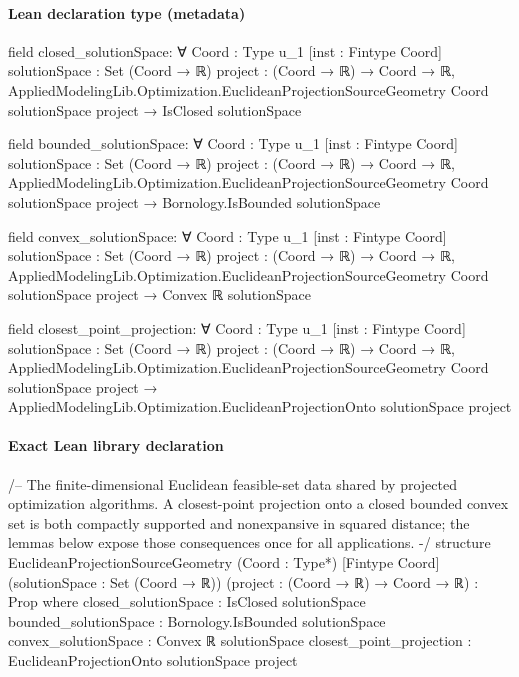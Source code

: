 \documentclass[10pt]{article}
\begin{document}
\paragraph{Lean declaration type (metadata)}
\begin{ReviewVerbatim}
field closed_solutionSpace:
∀ {Coord : Type u_1} [inst : Fintype Coord] {solutionSpace : Set (Coord → ℝ)} {project : (Coord → ℝ) → Coord → ℝ},
  AppliedModelingLib.Optimization.EuclideanProjectionSourceGeometry Coord solutionSpace project → IsClosed solutionSpace

field bounded_solutionSpace:
∀ {Coord : Type u_1} [inst : Fintype Coord] {solutionSpace : Set (Coord → ℝ)} {project : (Coord → ℝ) → Coord → ℝ},
  AppliedModelingLib.Optimization.EuclideanProjectionSourceGeometry Coord solutionSpace project →
    Bornology.IsBounded solutionSpace

field convex_solutionSpace:
∀ {Coord : Type u_1} [inst : Fintype Coord] {solutionSpace : Set (Coord → ℝ)} {project : (Coord → ℝ) → Coord → ℝ},
  AppliedModelingLib.Optimization.EuclideanProjectionSourceGeometry Coord solutionSpace project → Convex ℝ solutionSpace

field closest_point_projection:
∀ {Coord : Type u_1} [inst : Fintype Coord] {solutionSpace : Set (Coord → ℝ)} {project : (Coord → ℝ) → Coord → ℝ},
  AppliedModelingLib.Optimization.EuclideanProjectionSourceGeometry Coord solutionSpace project →
    AppliedModelingLib.Optimization.EuclideanProjectionOnto solutionSpace project
\end{ReviewVerbatim}

\paragraph{Exact Lean library declaration}
\begin{ReviewVerbatim}
/--
The finite-dimensional Euclidean feasible-set data shared by projected
optimization algorithms.  A closest-point projection onto a closed bounded
convex set is both compactly supported and nonexpansive in squared distance;
the lemmas below expose those consequences once for all applications.
-/
structure EuclideanProjectionSourceGeometry
    (Coord : Type*) [Fintype Coord]
    (solutionSpace : Set (Coord → ℝ))
    (project : (Coord → ℝ) → Coord → ℝ) : Prop where
  closed_solutionSpace : IsClosed solutionSpace
  bounded_solutionSpace : Bornology.IsBounded solutionSpace
  convex_solutionSpace : Convex ℝ solutionSpace
  closest_point_projection : EuclideanProjectionOnto solutionSpace project
\end{ReviewVerbatim}
\end{document}
